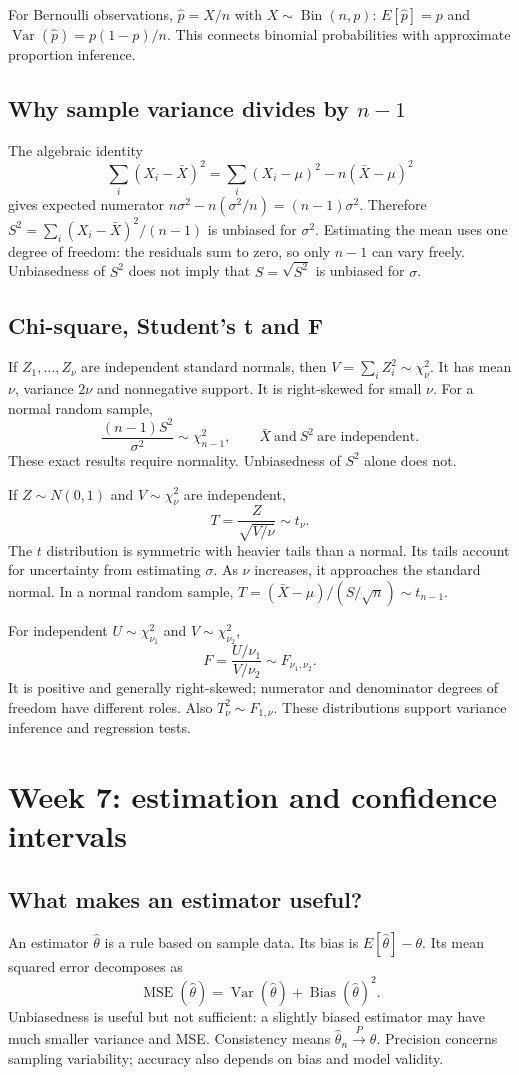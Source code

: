 For Bernoulli observations, $\hat p=X/n$ with $X\sim\operatorname{Bin}(n,p)$:
$E[\hat p]=p$ and $\operatorname{Var}(\hat p)=p(1-p)/n$. This connects
binomial probabilities with approximate proportion inference.

\subsection{Why sample variance divides by $n-1$}
The algebraic identity
\[
\sum_i(X_i-\bar X)^2=\sum_i(X_i-\mu)^2-n(\bar X-\mu)^2
\]
gives expected numerator $n\sigma^2-n(\sigma^2/n)=(n-1)\sigma^2$.
Therefore $S^2=\sum_i(X_i-\bar X)^2/(n-1)$ is unbiased for $\sigma^2$.
Estimating the mean uses one degree of freedom: the residuals sum to zero,
so only $n-1$ can vary freely. Unbiasedness of $S^2$ does not imply that
$S=\sqrt{S^2}$ is unbiased for $\sigma$.

\subsection{Chi-square, Student's t and F}
If $Z_1,\ldots,Z_\nu$ are independent standard normals, then
$V=\sum_iZ_i^2\sim\chi^2_\nu$. It has mean $\nu$, variance $2\nu$ and
nonnegative support. It is right-skewed for small $\nu$.
For a normal random sample,
\[
\frac{(n-1)S^2}{\sigma^2}\sim\chi^2_{n-1},\qquad
\bar X\ \text{and}\ S^2\ \text{are independent}.
\]
These exact results require normality. Unbiasedness of $S^2$ alone does not.

If $Z\sim N(0,1)$ and $V\sim\chi^2_\nu$ are independent,
\[
T=\frac{Z}{\sqrt{V/\nu}}\sim t_\nu.
\]
The $t$ distribution is symmetric with heavier tails than a normal. Its
tails account for uncertainty from estimating $\sigma$. As $\nu$ increases,
it approaches the standard normal. In a normal random sample,
$T=(\bar X-\mu)/(S/\sqrt n)\sim t_{n-1}$.

For independent $U\sim\chi^2_{\nu_1}$ and $V\sim\chi^2_{\nu_2}$,
\[
F=\frac{U/\nu_1}{V/\nu_2}\sim F_{\nu_1,\nu_2}.
\]
It is positive and generally right-skewed; numerator and denominator
degrees of freedom have different roles. Also $T_\nu^2\sim F_{1,\nu}$.
These distributions support variance inference and regression tests.

\clearpage
\section{Week 7: estimation and confidence intervals}
\subsection{What makes an estimator useful?}
An estimator $\hat\theta$ is a rule based on sample data. Its bias is
$E[\hat\theta]-\theta$. Its mean squared error decomposes as
\[
\operatorname{MSE}(\hat\theta)
=\operatorname{Var}(\hat\theta)+\operatorname{Bias}(\hat\theta)^2.
\]
Unbiasedness is useful but not sufficient: a slightly biased estimator may
have much smaller variance and MSE. Consistency means
$\hat\theta_n\xrightarrow{P}\theta$. Precision concerns sampling variability;
accuracy also depends on bias and model validity.


